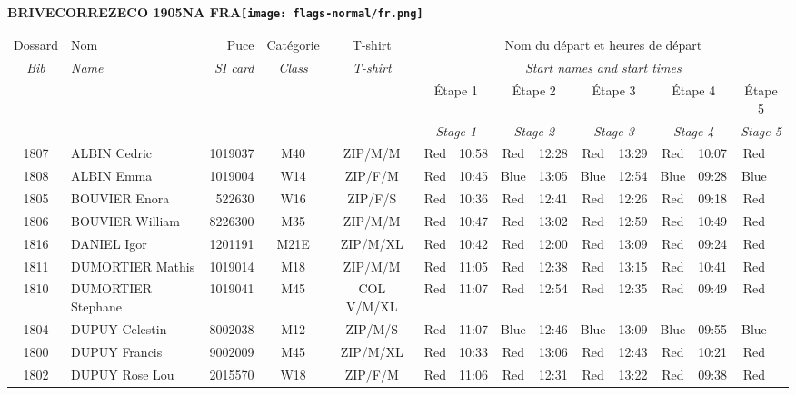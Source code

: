 \documentclass{report}
\begin{document}
\newpage
  \Huge \centering \bfseries BRIVECORREZECO 1905NA FRA\normalfont \footnotesize \sffamily \hfill \texttt{[image: flags-normal/fr.png]} \newline 
  \begin{longtable}{|c|l|r|c|c|*{5}{cc|}}
    Dossard & Nom  & Puce    & Catégorie & T-shirt & \multicolumn{10}{c|}{Nom du départ et heures de départ} \\
    \itshape Bib     & \itshape Name & \itshape SI card & \itshape Class  & \itshape  T-shirt  & \multicolumn{10}{c|}{\itshape Start names and start times} \\
    \hline
    & & & & & \multicolumn{2}{c|}{Étape 1} & \multicolumn{2}{c|}{Étape 2} & \multicolumn{2}{c|}{Étape 3} & \multicolumn{2}{c|}{Étape 4} & \multicolumn{2}{c|}{Étape 5} \\
    & & & & & \multicolumn{2}{c|}{\itshape Stage 1} & \multicolumn{2}{c|}{\itshape Stage 2} & \multicolumn{2}{c|}{\itshape Stage 3} & \multicolumn{2}{c|}{\itshape Stage 4} & \multicolumn{2}{c|}{\itshape Stage 5} \\
    \hline
    1807 & ALBIN Cedric & 1019037 & M40 & ZIP/M/M & Red & 10:58 & Red & 12:28 & Red & 13:29 & Red & 10:07 & Red &  \\
    1808 & ALBIN Emma & 1019004 & W14 & ZIP/F/M & Red & 10:45 & Blue & 13:05 & Blue & 12:54 & Blue & 09:28 & Blue &  \\
    1805 & BOUVIER Enora & 522630 & W16 & ZIP/F/S & Red & 10:36 & Red & 12:41 & Red & 12:26 & Red & 09:18 & Red &  \\
    1806 & BOUVIER William & 8226300 & M35 & ZIP/M/M & Red & 10:47 & Red & 13:02 & Red & 12:59 & Red & 10:49 & Red &  \\
    1816 & DANIEL Igor & 1201191 & M21E & ZIP/M/XL & Red & 10:42 & Red & 12:00 & Red & 13:09 & Red & 09:24 & Red &  \\
    1811 & DUMORTIER Mathis & 1019014 & M18 & ZIP/M/M & Red & 11:05 & Red & 12:38 & Red & 13:15 & Red & 10:41 & Red &  \\
    1810 & DUMORTIER Stephane & 1019041 & M45 & COL V/M/XL & Red & 11:07 & Red & 12:54 & Red & 12:35 & Red & 09:49 & Red &  \\
    1804 & DUPUY Celestin & 8002038 & M12 & ZIP/M/S & Red & 11:07 & Blue & 12:46 & Blue & 13:09 & Blue & 09:55 & Blue &  \\
    1800 & DUPUY Francis & 9002009 & M45 & ZIP/M/XL & Red & 10:33 & Red & 13:06 & Red & 12:43 & Red & 10:21 & Red &  \\
    1802 & DUPUY Rose Lou & 2015570 & W18 & ZIP/F/M & Red & 11:06 & Red & 12:31 & Red & 13:22 & Red & 09:38 & Red &  \\

\end{longtable}
\end{document}
